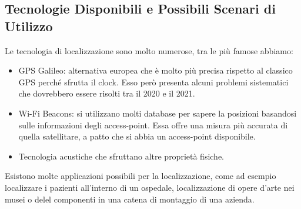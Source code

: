         \subsection{Tecnologie Disponibili e Possibili Scenari di
Utilizzo}\label{subsec3.2}
        Le tecnologia di localizzazione sono molto numerose, tra le più famose
abbiamo:
        \begin{itemize}
                \item GPS Galileo: alternativa europea che è molto più precisa
rispetto al classico GPS perché sfrutta il clock. Esso però presenta alcuni
problemi sistematici che dovrebbero essere risolti tra il 2020 e il 2021.
                \item Wi-Fi Beacons: si utilizzano molti database per sapere la
posizioni basandosi sulle informazioni degli access-point. Essa offre una misura
più accurata di quella satellitare, a patto che si abbia un access-point
disponibile.
                \item Tecnologia acustiche che sfruttano altre proprietà
fisiche.
        \end{itemize}

        Esistono molte applicazioni possibili per la localizzazione, come ad
esempio localizzare i pazienti all'interno di un ospedale, localizzazione di
opere d'arte nei musei o delel componenti in una catena di montaggio di una
azienda.

